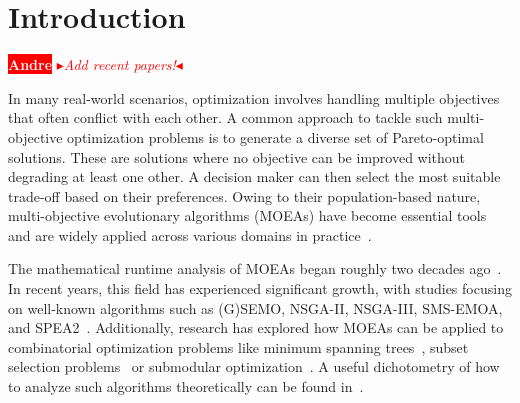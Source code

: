 \documentclass[
sigconf = false, %
review = false, %
screen = true, %
anonymous = true, %
format=acmsmall
]{acmart}
\newcommand{\nbc}[3]{
		{\colorbox{#3}{\bfseries\sffamily\scriptsize\textcolor{white}{#1}}}
		{\textcolor{#3}{\sf\small$\blacktriangleright$\textit{#2}$\blacktriangleleft$}}
}
\newcommand{\andre}[1]{\nbc{Andre}{#1}{red}}
\begin{document}
\section{Introduction}
\label{sec:introduction}
\andre{Add recent papers!}
In many real-world scenarios, optimization involves handling multiple objectives that often conflict with each other. A common approach to tackle such multi-objective optimization problems is to generate a diverse set of Pareto-optimal solutions. These are solutions where no objective can be improved without degrading at least one other. A decision maker can then select the most suitable trade-off based on their preferences. Owing to their population-based nature, multi-objective evolutionary algorithms (MOEAs) have become essential tools and are widely applied across various domains in practice~\cite{kdeb01,coello2013evolutionary}. 

The mathematical runtime analysis of MOEAs began roughly two decades ago~\cite{LaumannsTZWD02,Giel03,Thierens03}. In recent years, this field has experienced significant growth, with studies focusing on well-known algorithms such as (G)SEMO, NSGA-II, NSGA-III, SMS-EMOA, and SPEA2~\cite{Laumanns2004,DoerrNearTight,UpBian,RenBLQ24,Opris2025,OprisNSGAIII}. Additionally, research has explored how MOEAs can be applied to combinatorial optimization problems like minimum spanning trees~\cite{DBLP:conf/ijcai/CerfDHKW23}, subset selection problems~\cite{MOEASubset} or submodular optimization~\cite{QianYTYZ19}. A useful dichotometry of how to analyze such algorithms theoretically can be found in~\cite{Dang-Levels}.
\end{document}
